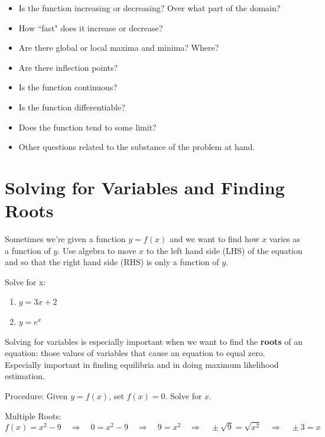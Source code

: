 \documentclass[]{book}
\providecommand{\tightlist}{%
  \setlength{\itemsep}{0pt}\setlength{\parskip}{0pt}}
\theoremstyle{definition}
\theoremstyle{definition}
\theoremstyle{definition}
\theoremstyle{remark}
\let\BeginKnitrBlock\begin \let\EndKnitrBlock\end
\begin{document}
\begin{itemize}
\tightlist
\item
  Is the function increasing or decreasing? Over what part of the domain?
\item
  How ``fast" does it increase or decrease?
\item
  Are there global or local maxima and minima? Where?
\item
  Are there inflection points?
\item
  Is the function continuous?
\item
  Is the function differentiable?
\item
  Does the function tend to some limit?
\item
  Other questions related to the substance of the problem at hand.
\end{itemize}

\hypertarget{solving-for-variables-and-finding-roots}{%
\section{Solving for Variables and Finding Roots}\label{solving-for-variables-and-finding-roots}}

Sometimes we're given a function \(y=f(x)\) and we want to find how \(x\) varies as a function of \(y\). Use algebra to move \(x\) to the left hand side (LHS) of the equation and so that the right hand side (RHS) is only a function of \(y\).

\BeginKnitrBlock{example}[Solving for Variables]
\protect\hypertarget{exm:solvevar}{}{\label{exm:solvevar} {} }

Solve for x:

\begin{enumerate}
\def\labelenumi{\arabic{enumi}.}
\item
  \(y=3x+2\)
\item
  \(y=e^x\)
\end{enumerate}
\EndKnitrBlock{example}

Solving for variables is especially important when we want to find the \textbf{roots} of an equation: those values of variables that cause an equation to equal zero. Especially important in finding equilibria and in doing maximum likelihood estimation.

Procedure: Given \(y=f(x)\), set \(f(x)=0\). Solve for \(x\).

Multiple Roots:
\[f(x)=x^2 - 9 \quad\Longrightarrow\quad 0=x^2 - 9 \quad\Longrightarrow\quad 9=x^2 \quad\Longrightarrow\quad \pm \sqrt{9}=\sqrt{x^2} \quad\Longrightarrow\quad \pm 3=x\]
\end{document}
